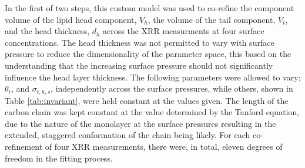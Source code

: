 \documentclass[twoside,twocolumn,9pt]{article}
\begin{document}
In the first of two steps, this custom model was used to co-refine the component volume of the lipid head component, $V_h$, the volume of the tail component, $V_t$, and the head thickness, $d_h$ across the XRR measurments at four surface concentrations. The head thickness was not permitted to vary with surface pressure to reduce the dimensionality of the parameter space, this based on the understanding that the increasing surface pressure should not significantly influence the head layer thickness. The following parameters were allowed to vary; $\theta_t$, and $\sigma_{t,h,s}$, independently across the surface pressures, while others, shown in Table \ref{tab:invariant}, were held constant at the values given. The length of the carbon chain was kept constant at the value determined by the Tanford equation,\cite{Tanford1980} due to the nature of the monolayer at the surface pressures resulting in the extended, staggered conformation of the chain being likely. For each co-refinement of four XRR measurements, there were, in total, eleven degrees of freedom in the fitting process.
\end{document}
